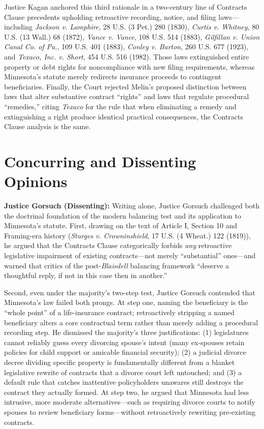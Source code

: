 \documentclass[12pt]{article}
\begin{document}
Justice Kagan anchored this third rationale in a two-century line of Contracts Clause precedents upholding retroactive recording, notice, and filing laws---including \textit{Jackson v. Lamphire}, 28 U.S. (3 Pet.) 280 (1830), \textit{Curtis v. Whitney}, 80 U.S. (13 Wall.) 68 (1872), \textit{Vance v. Vance}, 108 U.S. 514 (1883), \textit{Gilfillan v. Union Canal Co. of Pa.}, 109 U.S. 401 (1883), \textit{Conley v. Barton}, 260 U.S. 677 (1923), and \textit{Texaco, Inc. v. Short}, 454 U.S. 516 (1982). Those laws extinguished entire property or debt rights for noncompliance with new filing requirements, whereas Minnesota's statute merely redirects insurance proceeds to contingent beneficiaries. Finally, the Court rejected Melin's proposed distinction between laws that alter substantive contract ``rights'' and laws that regulate procedural ``remedies,'' citing \textit{Texaco} for the rule that when eliminating a remedy and extinguishing a right produce identical practical consequences, the Contracts Clause analysis is the same.

\section{Concurring and Dissenting Opinions}
\textbf{Justice Gorsuch (Dissenting):} Writing alone, Justice Gorsuch challenged both the doctrinal foundation of the modern balancing test and its application to Minnesota's statute. First, drawing on the text of Article I, Section 10 and Framing-era history (\textit{Sturges v. Crowninshield}, 17 U.S. (4 Wheat.) 122 (1819)), he argued that the Contracts Clause categorically forbids \textit{any} retroactive legislative impairment of existing contracts---not merely ``substantial'' ones---and warned that critics of the post-\textit{Blaisdell} balancing framework ``deserve a thoughtful reply, if not in this case then in another.''

Second, even under the majority's two-step test, Justice Gorsuch contended that Minnesota's law failed both prongs. At step one, naming the beneficiary is the ``whole point'' of a life-insurance contract; retroactively stripping a named beneficiary alters a core contractual term rather than merely adding a procedural recording step. He dismissed the majority's three justifications: (1) legislatures cannot reliably guess every divorcing spouse's intent (many ex-spouses retain policies for child support or amicable financial security); (2) a judicial divorce decree dividing specific property is fundamentally different from a blanket legislative rewrite of contracts that a divorce court left untouched; and (3) a default rule that catches inattentive policyholders unawares still destroys the contract they actually formed. At step two, he argued that Minnesota had less intrusive, more moderate alternatives---such as requiring divorce courts to notify spouses to review beneficiary forms---without retroactively rewriting pre-existing contracts.
\end{document}
